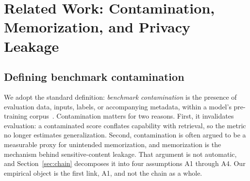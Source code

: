 %
%

\section{Related Work: Contamination, Memorization, and Privacy Leakage}
\label{sec:relatedwork}

\subsection{Defining benchmark contamination}
We adopt the standard definition: \emph{benchmark contamination} is the presence of
evaluation data, inputs, labels, or accompanying metadata, within a model's
pre-training corpus~\citep{golchin2024timetravel}. Contamination matters for two
reasons. First, it invalidates evaluation: a contaminated score conflates capability
with retrieval, so the metric no longer estimates generalization. Second,
contamination is often argued to be a measurable proxy for unintended memorization,
and memorization is the mechanism behind sensitive-content leakage. That argument is
not automatic, and Section~\ref{sec:chain} decomposes it into four assumptions A1
through A4. Our empirical object is the first link, A1, and not the chain as a whole.

